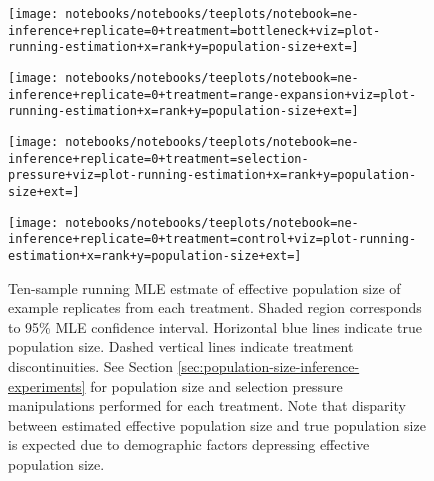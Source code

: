 \begin{figure}
  \centering
  \begin{minipage}{\textwidth} %

    \begin{minipage}{0.5\textwidth}
      \centering
      \texttt{[image: notebooks/notebooks/teeplots/notebook=ne-inference+replicate=0+treatment=bottleneck+viz=plot-running-estimation+x=rank+y=population-size+ext=]}
      \label{fig:ne-example-replicates:bottleneck}
    \end{minipage}%
    \begin{minipage}{0.5\textwidth}
      \centering
      \texttt{[image: notebooks/notebooks/teeplots/notebook=ne-inference+replicate=0+treatment=range-expansion+viz=plot-running-estimation+x=rank+y=population-size+ext=]}
      \label{fig:ne-example-replicates:range_expansion}
    \end{minipage}

    \begin{minipage}{0.5\textwidth}
      \centering
      \texttt{[image: notebooks/notebooks/teeplots/notebook=ne-inference+replicate=0+treatment=selection-pressure+viz=plot-running-estimation+x=rank+y=population-size+ext=]}
      \label{fig:ne-example-replicates:selection_pressure}
    \end{minipage}%
    \begin{minipage}{0.5\textwidth}
      \centering
      \texttt{[image: notebooks/notebooks/teeplots/notebook=ne-inference+replicate=0+treatment=control+viz=plot-running-estimation+x=rank+y=population-size+ext=]}
      \label{fig:ne-example-replicates:control}
    \end{minipage}

  \end{minipage}
  \hfill %
  \begin{minipage}{\textwidth} %
    \vspace{2ex}
    \caption{Ten-sample running MLE estmate of effective population size of example replicates from  each treatment.
    Shaded region corresponds to 95\% MLE confidence interval.
    Horizontal blue lines indicate true population size.
    Dashed vertical lines indicate treatment discontinuities.
    See Section \ref{sec:population-size-inference-experiments} for population size and selection pressure manipulations performed for each treatment.
    Note that disparity between estimated effective population size and true population size is expected due to demographic factors depressing effective population size.
    }
    \label{fig:ne-example-replicates}
  \end{minipage}

\end{figure}


